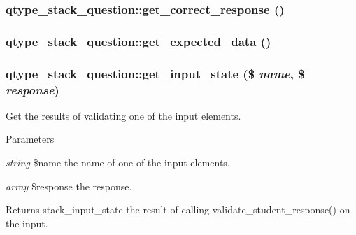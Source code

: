 \label{classqtype__stack__question_a6d3e2e228c2b6af0f5db437f0ea1fbda}
\hypertarget{classqtype__stack__question_a92a9d2c3673c139ef09e9ecb08cd9f2e}{
\subsubsection[{get\_\-correct\_\-response}]{\setlength{\rightskip}{0pt plus 5cm}qtype\_\-stack\_\-question::get\_\-correct\_\-response ()}}
\label{classqtype__stack__question_a92a9d2c3673c139ef09e9ecb08cd9f2e}
\hypertarget{classqtype__stack__question_ace8c6f36e84d6cc4b7107a4b76e305ea}{
\subsubsection[{get\_\-expected\_\-data}]{\setlength{\rightskip}{0pt plus 5cm}qtype\_\-stack\_\-question::get\_\-expected\_\-data ()}}
\label{classqtype__stack__question_ace8c6f36e84d6cc4b7107a4b76e305ea}
\hypertarget{classqtype__stack__question_ae4f0da0056f1478a8f2fd2c80d672ad4}{
\subsubsection[{get\_\-input\_\-state}]{\setlength{\rightskip}{0pt plus 5cm}qtype\_\-stack\_\-question::get\_\-input\_\-state (\$ {\em name}, \/  \$ {\em response})}}
\label{classqtype__stack__question_ae4f0da0056f1478a8f2fd2c80d672ad4}
Get the results of validating one of the input elements. 
\begin{DoxyParams}{Parameters}
\item[{\em string}]\$name the name of one of the input elements. \item[{\em array}]\$response the response. \end{DoxyParams}
\begin{DoxyReturn}{Returns}
stack\_\-input\_\-state the result of calling validate\_\-student\_\-response() on the input. 
\end{DoxyReturn}
